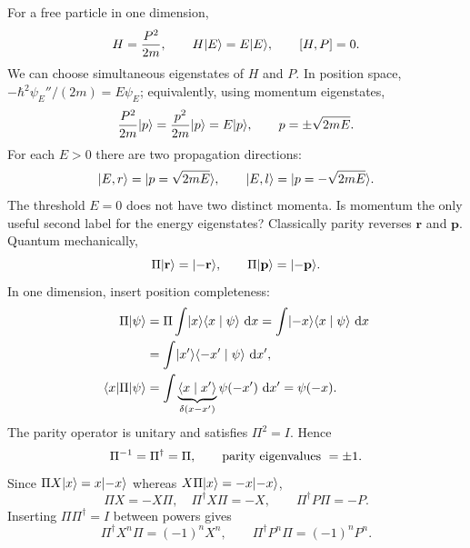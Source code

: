 For a free particle in one dimension,
\[
 H=\frac{P^2}{2m},\qquad H\lvert E\rangle=E\lvert E\rangle,\qquad\left[H,P\right]=0.
\]
We can choose simultaneous eigenstates of $H$ and $P$. In position space,
$-\hbar^2\psi_E''/(2m)=E\psi_E$; equivalently, using momentum eigenstates,
\[
 \frac{P^2}{2m}\lvert p\rangle=\frac{p^2}{2m}\lvert p\rangle=E\lvert p\rangle,
 \qquad p=\pm\sqrt{2mE}.
\]
For each $E>0$ there are two propagation directions:
\[
 \lvert E,r\rangle=\lvert p=\sqrt{2mE}\rangle,\qquad
 \lvert E,l\rangle=\lvert p=-\sqrt{2mE}\rangle.
\]
The threshold $E=0$ does not have two distinct momenta. Is momentum the
only useful second label for the energy eigenstates?
Classically parity reverses $\mathbf r$ and $\mathbf p$. Quantum mechanically,
\[
 \Pi\lvert \mathbf r\rangle=\lvert -\mathbf r\rangle,\qquad
 \Pi\lvert \mathbf p\rangle=\lvert -\mathbf p\rangle.
\]
In one dimension, insert position completeness:
\begin{align*}
 \Pi\lvert \psi\rangle
 &=\Pi\int\lvert x\rangle\langle x\mid \psi\rangle\,\mathop{}\!\mathrm{d} x
 =\int\lvert -x\rangle\langle x\mid \psi\rangle\,\mathop{}\!\mathrm{d} x\\
 &=\int\lvert x'\rangle\langle -x'\mid \psi\rangle\,\mathop{}\!\mathrm{d} x',\\
 \langle x\rvert \Pi\lvert \psi\rangle
 &=\int\underbrace{\langle x\mid x'\rangle}_{\delta(x-x')}
          \psi(-x')\,\mathop{}\!\mathrm{d} x'=\psi(-x).
\end{align*}
The parity operator is unitary and satisfies $\Pi^2=I$. Hence
\[
 \Pi^{-1}=\Pi^\dagger=\Pi,\qquad \hbox{parity eigenvalues }=\pm1.
\]
Since $\Pi X\lvert x\rangle=x\lvert -x\rangle$ whereas $X\Pi\lvert x\rangle=-x\lvert -x\rangle$,
\[
 \Pi X=-X\Pi,\quad\Pi^\dagger X\Pi=-X,\qquad
 \Pi^\dagger P\Pi=-P.
\]
Inserting $\Pi\Pi^\dagger=I$ between powers gives
\[
 \Pi^\dagger X^n\Pi=(-1)^nX^n,\qquad
 \Pi^\dagger P^n\Pi=(-1)^nP^n.
\]
